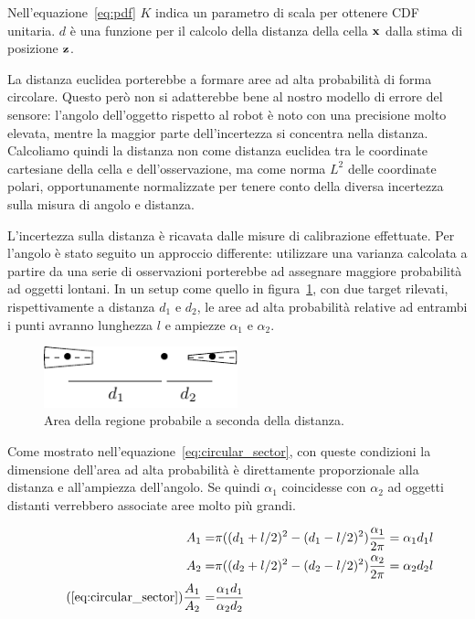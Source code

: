 \documentclass[a4paper]{article}
\begin{document}
	Nell'equazione~\ref{eq:pdf} $K$ indica un parametro di scala per ottenere
	CDF unitaria. $d$ è una funzione per il calcolo della distanza della cella
	${\bf x}$ dalla stima di posizione ${\bf z}$.

	La distanza euclidea porterebbe a formare aree ad alta probabilità di forma
	circolare. Questo però non si adatterebbe bene al nostro modello di errore
	del sensore: l'angolo dell'oggetto rispetto al robot è noto con una
	precisione molto elevata, mentre la maggior parte dell'incertezza si
	concentra nella distanza. Calcoliamo quindi la distanza non come distanza
	euclidea tra le coordinate cartesiane della cella e dell'osservazione, ma
	come norma $L^2$ delle coordinate polari, opportunamente normalizzate per
	tenere conto della diversa incertezza sulla misura di angolo e distanza.

	L'incertezza sulla distanza è ricavata dalle misure di calibrazione
	effettuate. Per l'angolo è stato seguito un approccio differente:
	utilizzare una varianza calcolata a partire da una serie di osservazioni
	porterebbe ad assegnare maggiore probabilità ad oggetti lontani.  In un
	setup come quello in figura~\ref{fig:circular_sector}, con due target
	rilevati, rispettivamente a distanza $d_1$ e $d_2$, le aree ad alta
	probabilità relative ad entrambi i punti avranno lunghezza $l$ e ampiezze $
	\alpha_1 \text{ e } \alpha_2  $. 
	
	\begin{figure}[H]
		\centering
		\includegraphics[width=0.5\textwidth]{img/circular_sector.pdf}
		\caption{Area della regione probabile a seconda della distanza.}
		\label{fig:circular_sector}
	\end{figure}

	Come mostrato nell'equazione~\ref{eq:circular_sector}, con queste
	condizioni la dimensione dell'area ad alta probabilità è direttamente
	proporzionale alla distanza e all'ampiezza dell'angolo. Se quindi $
	\alpha_1 $ coincidesse con $ \alpha _2 $ ad oggetti distanti verrebbero
	associate aree molto più grandi. 

	\begin{subequations}\label{eq:circular_sector}
	\begin{align*} 
		A_1  = & \pi((d_1+l/2)^2-(d_1-l/2)^2)\frac{\alpha_1}{2\pi}  =  \alpha_1 d_1l \\
		A_2  = & \pi((d_2+l/2)^2-(d_2-l/2)^2)\frac{\alpha_2}{2\pi}  =  \alpha_2 d_2l \\
\tag{\ref{eq:circular_sector}}
		\frac{A_1}{A_2} = & \frac	{\alpha_1 d_1} {\alpha_2 d_2}
	\end{align*}
	\end{subequations}
	
\end{document}
